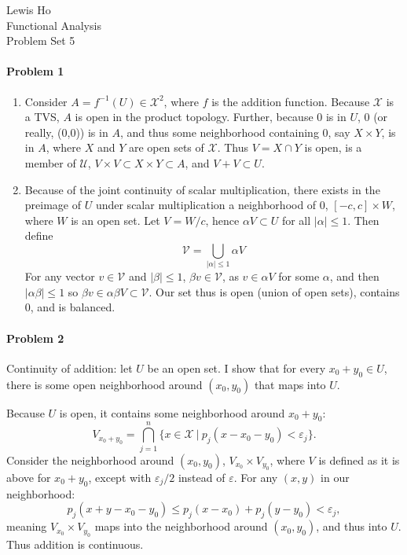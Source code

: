 \documentclass[12pt]{article}
\newcommand{\X}{\mathcal{X}}
\begin{document}
\begin{center}
  Lewis Ho\\
  Functional Analysis\\
  Problem Set 5
\end{center}

\paragraph{Problem 1}

\begin{enumerate}[label=\alph*)]
\item Consider $A = f^{-1}(U) \in \X^2$, where $f$ is the addition function.
  Because $\X$ is a TVS, $A$ is open in the product topology. Further, because
  0 is in $U$, 0 (or really, (0,0)) is in $A$, and thus some neighborhood
  containing 0, say $X\times Y$, is in $A$, where $X$ and $Y$ are open sets
  of $\X$. Thus $V = X\cap Y$ is open, is a member of $\mathcal{U}$,
  $V\times V \subset X\times Y \subset A$, and $V+V \subset U$.
\item Because of the joint continuity of scalar multiplication, there exists
  in the preimage of $U$ under scalar multiplication a neighborhood of 0,
  $[-c, c]\times W$, where $W$ is an open set. Let $V = W/c$, hence $\alpha V
  \subset U$ for all $|\alpha| \leq 1$. Then define
  \begin{displaymath}
    \mathcal{V} = \bigcup_{|\alpha| \leq 1}\alpha V
  \end{displaymath}
  For any vector $v \in \mathcal{V}$ and $|\beta| \leq 1$, $\beta v \in
  \mathcal{V}$, as $v \in \alpha V$ for some $\alpha$, and then $|\alpha\beta|
  \leq 1$ so $\beta v \in \alpha\beta V \subset \mathcal{V}$. Our set
  thus is open (union of open sets), contains 0, and is balanced.
\end{enumerate}

\paragraph{Problem 2}

Continuity of addition: let $U$ be an open set. I show that for every $x_0 +
y_0 \in U$, there is some open neighborhood around $(x_0,y_0)$ that maps into
$U$.

Because $U$ is open, it contains some neighborhood around $x_0+y_0$:
\begin{displaymath}
  V_{x_0+y_0} = \bigcap_{j=1}^n\{x\in \X\ |\ p_j(x-x_0-y_0) < \varepsilon_j\}.
\end{displaymath}
Consider the neighborhood around $(x_0,y_0)$, $V_{x_0}\times V_{y_0}$,
where $V$ is defined as it is above for ${x_0+y_0}$, except with $\varepsilon_j
/2$ instead of $\varepsilon$. For any $(x,y)$ in our neighborhood:
\begin{displaymath}
  p_j(x+y-x_0-y_0) \leq p_j(x-x_0)+p_j(y-y_0) < \varepsilon_j,
\end{displaymath}
meaning $V_{x_0}\times V_{y_0}$ maps into the neighborhood around $(x_0,y_0)$,
and thus into $U$. Thus addition is continuous.
\end{document}
